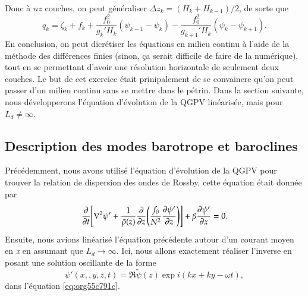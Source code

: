 \documentclass{article}
\numberwithin{equation}{section}
\newcommand{\tpsi}{\tilde{\psi}}
\begin{document}
Donc à \(nz\) couches, on peut généraliser \(\Delta z_k = (H_k + H_{k-1})/2\), de sorte que
\begin{equation}
\label{eq:org0f0a3a1}
q_k = \zeta_k + f_k + \frac{f_0^2}{g_k' H_k}(\psi_{k-1} - \psi_k) - \frac{f_0^2}{g_{k+1}' H_k}(\psi_k - \psi_{k+1}).
\end{equation}
En conclusion, on peut dicrétiser les équations en milieu continu à l'aide de la méthode des différences finies (sinon, ça serait difficile de faire de la numérique), tout en se permettant d'avoir une résolution horizontale de seulement deux couches.
Le but de cet exercice était prinipalement de se convaincre qu'on peut passer d'un milieu continu sans se mettre dans le pétrin.
Dans la section suivante, nous développerons l'équation d'évolution de la QGPV linéarisée, mais pour \(L_d \not = \infty\).

\subsection{Description des modes barotrope et baroclines}
\label{sec:orgbae2100}
Précédemment, nous avons utilisé l'équation d'évolution de la QGPV pour trouver la relation de dispersion des ondes de Rossby, cette équation était donnée par
\begin{equation}
\label{eq:org55c791c}
\pdv{t} \Bigg[ \laplacian \psi' + \frac{1}{\tilde{\rho}(z)}\pdv{z}\qty(\frac{f_0}{N^2}\pdv{\psi'}{z}) \Bigg] + \beta \pdv{\psi'}{x} = 0.
\end{equation}
Ensuite, nous avions linéarisé l'équation précédente autour d'un courant moyen en \emph{x} en assumant que \(L_d \rightarrow \infty\).
Ici, nous allons exactement réaliser l'inverse en posant une solution oscillante de la forme
\begin{equation}
\psi'(x,,y,z,t) = \Re \tpsi(z) \exp{ i(kx + ky - \omega t)},
\end{equation}
dans l'équation \ref{eq:org55c791c}.\bigskip
\end{document}
